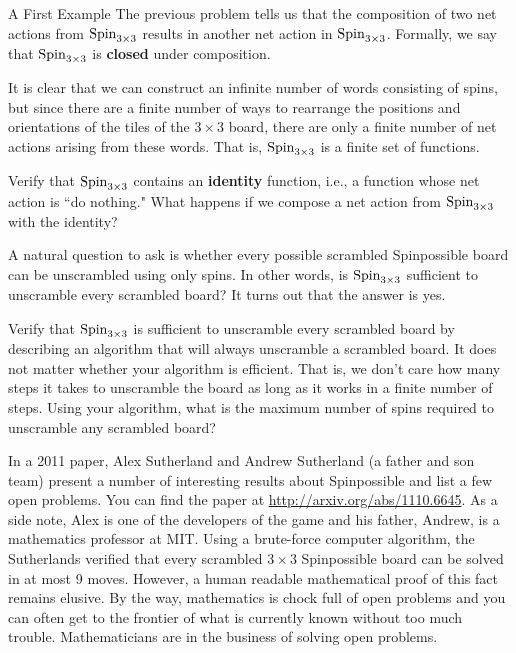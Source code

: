 \begin{section}{A First Example}
The previous problem tells us that the composition of two net actions from $\operatorname{Spin}_{3\times 3}$ results in another net action in $\operatorname{Spin}_{3\times 3}$. Formally, we say that $\operatorname{Spin}_{3\times 3}$ is \textbf{closed} under composition.

It is clear that we can construct an infinite number of words consisting of spins, but since there are a finite number of ways to rearrange the positions and orientations of the tiles of the $3\times 3$ board, there are only a finite number of net actions arising from these words.  That is, $\operatorname{Spin}_{3\times 3}$ is a finite set of functions.

\begin{problem}
Verify that $\operatorname{Spin}_{3\times 3}$ contains an \textbf{identity} function, i.e., a function whose net action is ``do nothing." What happens if we compose a net action from $\operatorname{Spin}_{3\times 3}$ with the identity?
\end{problem}

A natural question to ask is whether every possible scrambled Spinpossible board can be unscrambled using only spins.  In other words, is $\operatorname{Spin}_{3\times 3}$ sufficient to unscramble every scrambled board? It turns out that the answer is yes.

\begin{problem}\label{prob:kindergarten_algorthim}
Verify that $\operatorname{Spin}_{3\times 3}$ is sufficient to unscramble every scrambled board by describing an algorithm that will always unscramble a scrambled board.  It does not matter whether your algorithm is efficient.  That is, we don't care how many steps it takes to unscramble the board as long as it works in a finite number of steps.  Using your algorithm, what is the maximum number of spins required to unscramble any scrambled board?
\end{problem}

In a 2011 paper, Alex Sutherland and Andrew Sutherland (a father and son team) present a number of interesting results about Spinpossible and list a few open problems. You can find the paper at \url{http://arxiv.org/abs/1110.6645}. As a side note, Alex is one of the developers of the game and his father, Andrew, is a mathematics professor at MIT. Using a brute-force computer algorithm, the Sutherlands verified that every scrambled $3\times 3$ Spinpossible board can be solved in at most 9 moves. However, a human readable mathematical proof of this fact remains elusive.  By the way, mathematics is chock full of open problems and you can often get to the frontier of what is currently known without too much trouble.  Mathematicians are in the business of solving open problems.


\end{section}
